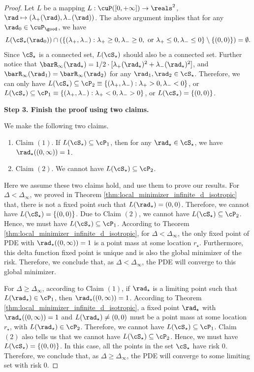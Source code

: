 \documentclass[11pt]{article}
\begin{document}
\begin{proof}
Let $L$ be a mapping $L: \cuP([0, +\infty]) \to \reals^2$, $\rad \mapsto (\lambda_+(\rad), \lambda_-(\rad))$. The above argument implies that for any $\rad_0 \in \cuP_{\good}$, we have
\[
L(\cS_\star(\rad_0)) \cap ( \{ (\lambda_+, \lambda_-): \lambda_+ \ge 0, \lambda_- \ge 0, \text{ or } \lambda_+ \le 0, \lambda_- \le 0\} \setminus \{(0, 0)\} ) = \emptyset.
\]
Since $\cS_\star$ is a connected set, $L(\cS_\star)$ should also be a connected set. Further notice that $\barR_\infty(\rad_\star) = 1/2 \cdot [\lambda_+(\rad_\star)^2 + \lambda_-(\rad_\star)^2]$, and $\barR_\infty(\rad_1) = \barR_\infty(\rad_2)$ for any $\rad_1, \rad_2 \in \cS_\star$. Therefore, we can only have $L(\cS_\star) \subseteq \cP_2 \equiv \{(\lambda_+, \lambda_-): \lambda_+ > 0, \lambda_- < 0\}$, or $L(\cS_\star) \subseteq \cP_1 \equiv \{(\lambda_+, \lambda_-): \lambda_+ < 0, \lambda_- > 0\}$, or $L(\cS_\star) = \{ (0, 0) \}$. 

\vskip 0.2cm
\noindent
{\bf Step 3. Finish the proof using two claims. }

We make the following two claims. 

\begin{enumerate}
\item[] Claim $(1)$. If $L(\cS_\star) \subseteq \cP_1$, then for any $\rad_\star \in \cS_\star$, we have $\rad_\star((0, \infty)) = 1$. 
\item[] Claim $(2)$. We cannot have $L(\cS_\star) \subseteq \cP_2$. 
\end{enumerate}

Here we assume these two claims hold, and use them to prove our results. For $\Delta < \Delta_\infty$, we proved in Theorem \ref{thm:local_minimizer_infinite_d_isotropic} that, there is not a fixed point such that $L(\rad_\star) = (0, 0)$. Therefore, we cannot have $L(\cS_\star) = \{ (0, 0) \}$. Due to Claim $(2)$, we cannot have $L(\cS_\star) \subseteq \cP_2$. Hence, we must have $L(\cS_\star) \subseteq \cP_1$. According to Theorem \ref{thm:local_minimizer_infinite_d_isotropic}, for $\Delta < \Delta_\infty$, the only fixed point of PDE with $\rad_\star((0, \infty)) = 1$ is a point mass at some location $r_\star$. Furthermore, this delta function fixed point is unique and is also the global minimizer of the risk. Therefore, we conclude that, as $\Delta < \Delta_\infty$, the PDE will converge to this global minimizer. 

For $\Delta \ge \Delta_\infty$, according to Claim $(1)$, if $\rad_\star$ is a limiting point such that $L(\rad_\star) \in \cP_1$, then $\rad_\star((0, \infty)) = 1$. According to Theorem \ref{thm:local_minimizer_infinite_d_isotropic}, a fixed point $\rad_\star$ with $\rad_\star((0, \infty)) = 1$ and $L(\rad_\star) \neq (0, 0)$ must be a point mass at some location $r_\star$, with $L(\rad_\star) \in \cP_2$. Therefore, we cannot have $L(\cS_\star) \subseteq \cP_1$. Claim $(2)$ also tells us that we cannot have $L(\cS_\star) \subseteq \cP_2$. Hence, we must have $L(\cS_\star) = \{ (0, 0) \}$. In this case, all the points in the set $\cS_\star$ have risk $0$. Therefore, we conclude that, as $\Delta \ge \Delta_\infty$, the PDE will converge to some limiting set with risk $0$. 



\end{proof}
\end{document}

